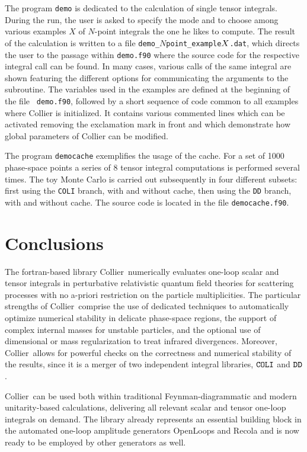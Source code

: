 \documentclass[preprint,sort&compress,12pt]{elsarticle}
\newcommand{\collier}{{\sc Collier}}
\begin{document}
The program {\tt demo} is dedicated to the calculation of single
tensor integrals. During the run, the user is asked to specify the
mode and to choose among various examples $X$ of $N$-point integrals
the one he likes to compute. The result of the calculation is written
to a file {\tt demo\_$N$point\_example$X\/$.dat}, which directs the
user to the passage within {\tt demo.f90} where the source code for
the respective integral call can be found. In many cases, various
calls of the same integral are shown featuring the different options
for communicating the arguments to the subroutine.  The variables used
in the examples are defined at the beginning of the file {\tt
  demo.f90}, followed by a short sequence of code common to all
examples where {\collier} is initialized. It contains various
commented lines which can be activated removing the exclamation mark
in front and which demonstrate how global parameters of {\collier}
can be modified.

The program {\tt democache} exemplifies the usage of the cache. For a
set of 1000 phase-space points a series of 8 tensor integral
computations is performed several times. The toy Monte Carlo is
carried out subsequently in four different subsets: first using the
{\tt COLI} branch, with and without cache, then using the {\tt DD}
branch, with and without cache. The source code is located in the file
{\tt democache.f90}.

\section{Conclusions}
\label{se:concl}

  The fortran-based library \collier\ numerically evaluates
  one-loop scalar and tensor integrals in perturbative relativistic
  quantum field theories for scattering processes with no a-priori
  restriction on the particle multiplicities.
  The particular strengths of \collier\ comprise the use of 
  dedicated techniques to automatically optimize numerical stability 
  in delicate phase-space regions, the support of complex internal masses
  for unstable particles,
  and the optional use of dimensional or mass regularization 
  to treat infrared divergences.
  Moreover, \collier\ allows for powerful checks on the correctness
  and numerical stability of the results, since it is a merger
  of two independent integral libraries, $\tt COLI$ and $\tt DD$.

  \collier\ can be used both within traditional Feynman-diagrammatic
  and modern unitarity-based calculations, delivering all relevant
  scalar and tensor one-loop integrals on demand. The library 
  already represents an essential building block in the automated
  one-loop amplitude generators {\sc OpenLoops} and {\sc Recola}
  and is now ready to be employed by other generators as well.
\end{document}
